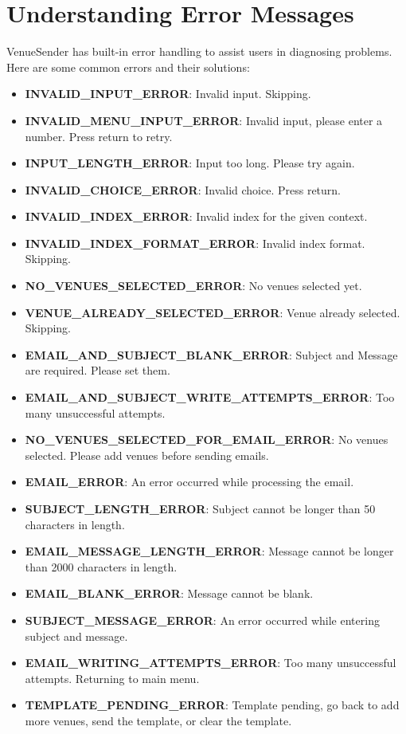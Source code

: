 \documentclass{article}
\begin{document}
	\section*{Understanding Error Messages}
	VenueSender has built-in error handling to assist users in diagnosing problems. Here are some common errors and their solutions:
	\begin{itemize}
		\item \textbf{INVALID\_INPUT\_ERROR}: Invalid input. Skipping.
		\item \textbf{INVALID\_MENU\_INPUT\_ERROR}: Invalid input, please enter a number. Press return to retry.
		\item \textbf{INPUT\_LENGTH\_ERROR}: Input too long. Please try again.
		\item \textbf{INVALID\_CHOICE\_ERROR}: Invalid choice. Press return.
		\item \textbf{INVALID\_INDEX\_ERROR}: Invalid index for the given context.
		\item \textbf{INVALID\_INDEX\_FORMAT\_ERROR}: Invalid index format. Skipping.
		\item \textbf{NO\_VENUES\_SELECTED\_ERROR}: No venues selected yet.
		\item \textbf{VENUE\_ALREADY\_SELECTED\_ERROR}: Venue already selected. Skipping.
		\item \textbf{EMAIL\_AND\_SUBJECT\_BLANK\_ERROR}: Subject and Message are required. Please set them.
		\item \textbf{EMAIL\_AND\_SUBJECT\_WRITE\_ATTEMPTS\_ERROR}: Too many unsuccessful attempts.
		\item \textbf{NO\_VENUES\_SELECTED\_FOR\_EMAIL\_ERROR}: No venues selected. Please add venues before sending emails.
		\item \textbf{EMAIL\_ERROR}: An error occurred while processing the email.
		\item \textbf{SUBJECT\_LENGTH\_ERROR}: Subject cannot be longer than 50 characters in length.
		\item \textbf{EMAIL\_MESSAGE\_LENGTH\_ERROR}: Message cannot be longer than 2000 characters in length.
		\item \textbf{EMAIL\_BLANK\_ERROR}: Message cannot be blank.
		\item \textbf{SUBJECT\_MESSAGE\_ERROR}: An error occurred while entering subject and message.
		\item \textbf{EMAIL\_WRITING\_ATTEMPTS\_ERROR}: Too many unsuccessful attempts. Returning to main menu.
		\item \textbf{TEMPLATE\_PENDING\_ERROR}: Template pending, go back to add more venues, send the template, or clear the template.

\end{itemize}
\end{document}
